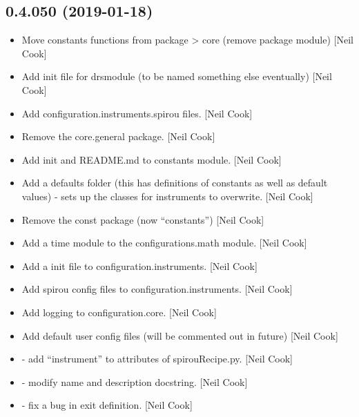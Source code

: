 \documentclass[a4paper,10pt,english]{report}
\begin{document}
\subsection{0.4.050 (2019-01-18)}
\label{\detokenize{misc/changelog:id213}}\begin{itemize}
\item {} 
Move constants functions from package \textendash{}\textgreater{} core (remove package module)
{[}Neil Cook{]}

\item {} 
Add init file for drsmodule (to be named something else eventually)
{[}Neil Cook{]}

\item {} 
Add configuration.instruments.spirou files. {[}Neil Cook{]}

\item {} 
Remove the core.general package. {[}Neil Cook{]}

\item {} 
Add init and README.md to constants module. {[}Neil Cook{]}

\item {} 
Add a defaults folder (this has definitions of constants as well as
default values) - sets up the classes for instruments to overwrite.
{[}Neil Cook{]}

\item {} 
Remove the const package (now “constants”) {[}Neil Cook{]}

\item {} 
Add a time module to the configurations.math module. {[}Neil Cook{]}

\item {} 
Add a init file to configuration.instruments. {[}Neil Cook{]}

\item {} 
Add spirou config files to configuration.instruments. {[}Neil Cook{]}

\item {} 
Add logging to configuration.core. {[}Neil Cook{]}

\item {} 
Add default user config files (will be commented out in future) {[}Neil
Cook{]}

\item {} 
 - add “instrument” to attributes of spirouRecipe.py.
{[}Neil Cook{]}

\item {} 
 - modify name and description docstring. {[}Neil Cook{]}

\item {} 
 - fix a bug in exit definition. {[}Neil Cook{]}

\end{itemize}
\end{document}

